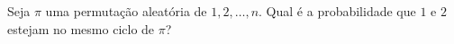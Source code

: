 Seja $\pi$ uma permutação aleatória de $1, 2, \dots, n$.
Qual é a probabilidade que $1$ e $2$ estejam no mesmo ciclo de $\pi$?
